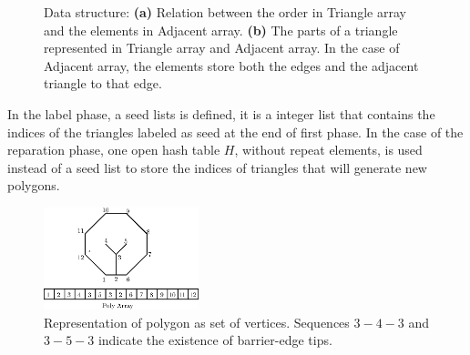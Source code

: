 \documentclass[pdflatex,sn-mathphys]{sn-jnl}%
\theoremstyle{thmstyleone}%
\theoremstyle{thmstyletwo}%
\theoremstyle{thmstylethree}%
\begin{document}
\begin{figure}
\centering     %
{}\hspace{2cm}
\caption{Data structure:  \textbf{(a)} Relation between the order in Triangle array and the elements in Adjacent array. \textbf{(b)} The parts of a triangle represented in Triangle array and Adjacent array. In the case of Adjacent array, the elements store both the edges and  the adjacent triangle to that edge.}
\label{figs:data_and_triangle} 
\end{figure}




In the label phase, a seed lists is defined, it is a integer list that contains the indices of the triangles labeled as seed at the end of first phase. In the case of the reparation phase, one open hash table $H$, without repeat elements, is used instead of a seed list to store the indices of triangles that will generate new polygons.

\begin{figure}
\centering     %
\includegraphics[width=0.4\textwidth]{polyarray.eps} 
\caption{Representation of polygon as set of vertices. Sequences $3 - 4 - 3$ and $3 - 5 - 3$ indicate the existence of barrier-edge tips.}%
\label{fig:a_data_poly} 
\end{figure}
\end{document}
